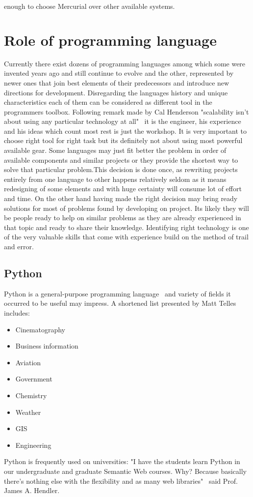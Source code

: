 enough to choose Mercurial over other available systems.     

\section{Role of programming language}\label{sec:languages}
Currently there exist dozens of programming languages among which some were invented years ago and still continue to evolve and the other, represented by newer ones that join best elements of their predecessors and introduce new directions for development. Disregarding the languages history and unique characteristics each of them can be considered as different tool in the programmers toolbox. Following remark made by Cal Henderson "scalability isn't about using any particular technology at all"~\cite[page 203]{build_scalable} it is the engineer, his experience and his ideas which count most rest is just the workshop. It is very important to choose right tool for right task but its definitely not about using most powerful available gear. Some languages may just fit better the problem in order of available components and similar projects or they provide the shortest way to solve that particular problem.This decision is done once, as rewriting projects entirely from one language to other happens relatively seldom as it means redesigning of some elements and with huge certainty will consume lot of effort and time. On the other hand having made the right decision may bring ready solutions for most of problems found by developing on project. Its likely they will be people ready to help on similar problems as they are already experienced in that topic and ready to share their knowledge. Identifying right technology is one of the very valuable skills that come with experience build on the method of trail and error. 
  
\subsection{Python}\label{subsec:py}
Python is a general-purpose programming language~\cite[page 3]{py_nutshell} and variety of fields it occurred to be useful may impress. A shortened list presented by Matt Telles~\cite[page 13]{py_power} includes:
\begin{itemize}
\item{Cinematography}
\item{Business information}
\item{Aviation}
\item{Government}
\item{Chemistry}
\item{Weather}
\item{GIS}
\item{Engineering}
\end{itemize}
Python is frequently used on universities: "I have the students learn Python in our undergraduate and graduate Semantic Web courses. Why? Because basically there's nothing else with the flexibility and as many web libraries"~\cite{py_quote} said Prof. James A. Hendler. 

